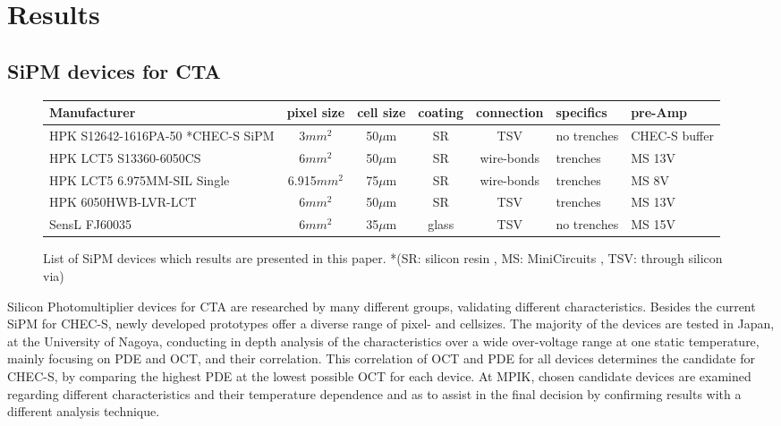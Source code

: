 \documentclass[12pt,article,type=msc,colorback,accentcolor=tud9c]{tudthesis}
\begin{document}
\clearpage
\newpage
\section{\Large Results}
\label{sec:results_ch}
\subsection{SiPM devices for CTA}

\begin{centering}
\begin{figure}[h]
\begin{tabular}{ |p{4.5cm} | c | c | c | c | p{1.5cm} | p{1.5cm} |}
    \hline
    Manufacturer                            & pixel size  & cell size & coating & connection & specifics               & pre-Amp       \\ \hline
    HPK S12642-1616PA-50  *CHEC-S SiPM               & 3$mm^2$     & 50$\mu$m  & SR      & TSV        &  no trenches & CHEC-S buffer \\ \hline
    HPK LCT5 S13360-6050CS                  & 6$mm^2$     & 50$\mu$m  & SR      & wire-bonds & trenches                & MS 13V        \\ \hline
    HPK LCT5 6.975MM-SIL Single                      & 6.915$mm^2$ & 75$\mu$m  & SR      & wire-bonds & trenches                & MS 8V         \\ \hline
    HPK 6050HWB-LVR-LCT                     & 6$mm^2$     & 50$\mu$m  & SR      & TSV        & trenches                & MS 13V        \\ \hline
    SensL FJ60035                           & 6$mm^2$     & 35$\mu$m  & glass   & TSV        & no trenches             & MS 15V        \\
    \hline
\end{tabular}
\caption[List of examined SiPM devices]{List of SiPM devices which results are presented in this paper. *(SR: silicon resin , MS: MiniCircuits , TSV: through silicon via)}
\end{figure}
\end{centering}
Silicon Photomultiplier devices for CTA are researched by many different groups, validating different characteristics. Besides the current SiPM for CHEC-S, newly developed prototypes offer a diverse range of pixel- and cellsizes. The majority of the devices are tested in Japan, at the University of Nagoya, conducting in depth analysis of the characteristics over a wide over-voltage range at one static temperature, mainly focusing on PDE and OCT, and their correlation. This correlation of OCT and PDE for all devices determines the candidate for CHEC-S, by comparing the highest PDE at the lowest possible OCT for each device. At MPIK, chosen candidate devices are examined regarding different characteristics and their temperature dependence and as to assist in the final decision by confirming results with a different analysis technique.\\\\
\end{document}
